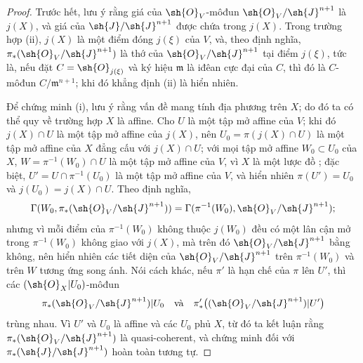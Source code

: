 \documentclass[oneside,10pt]{amsart}
\newcommand{\oldpage}[2][]{\marginnote{\normalfont\footnotesize\textbf{#1}~|~#2}\ignorespaces}
\begin{document}
\begin{proof}
Trước hết, lưu ý rằng giá của $\sh{O}_V$-môđun $\sh{O}_V/\sh{J}^{n+1}$ là $j(X)$, và giá của $\sh{J}/\sh{J}^{n+1}$ được chứa trong $j(X)$.
Trong trường hợp (ii), $j(X)$ là một điểm đóng $j(\xi)$ của $V$,
\oldpage[II]{185}
và, theo định nghĩa, $\pi_*(\sh{O}_V/\sh{J}^{n+1})$ là thớ của $\sh{O}_V/\sh{J}^{n+1}$ tại điểm $j(\xi)$, tức là, nếu đặt $C=\sh{O}_{j(\xi)}$ và ký hiệu $\mathfrak{m}$ là iđêan cực đại của $C$, thì đó là $C$-môđun $C/\mathfrak{m}^{n+1}$;
khi đó khẳng định (ii) là hiển nhiên.

Để chứng minh (i), lưu ý rằng vấn đề mang tính địa phương trên $X$;
do đó ta có thể quy về trường hợp $X$ là affine.
Cho $U$ là một tập mở affine của $V$;
khi đó $j(X)\cap U$ là một tập mở affine của $j(X)$, nên $U_0=\pi(j(X)\cap U)$ là một tập mở affine của $X$ đẳng cấu với $j(X)\cap U$;
với mọi tập mở affine $W_0\subset U_0$ của $X$, $W=\pi^{-1}(W_0)\cap U$ là một tập mở affine của $V$, vì $X$ là một lược đồ ;
đặc biệt, $U'=U\cap\pi^{-1}(U_0)$ là một tập mở affine của $V$, và hiển nhiên $\pi(U')=U_0$ và $j(U_0)=j(X)\cap U$.
Theo định nghĩa,
\[
  \Gamma(W_0,\pi_*(\sh{O}_V/\sh{J}^{n+1}))
  =\Gamma(\pi^{-1}(W_0),\sh{O}_V/\sh{J}^{n+1});
\]
nhưng vì mỗi điểm của $\pi^{-1}(W_0)$ không thuộc $j(W_0)$ đều có một lân cận mở trong $\pi^{-1}(W_0)$ không giao với $j(X)$, mà trên đó $\sh{O}_V/\sh{J}^{n+1}$ bằng không, nên hiển nhiên các tiết diện của $\sh{O}_V/\sh{J}^{n+1}$ trên $\pi^{-1}(W_0)$ và trên $W$ tương ứng song ánh.
Nói cách khác, nếu $\pi'$ là hạn chế của $\pi$ lên $U'$, thì các $(\sh{O}_X|U_0)$-môđun
\[
  \pi_*(\sh{O}_V/\sh{J}^{n+1})|U_0
  \quad\hbox{và}\quad
  \pi'_*\bigl((\sh{O}_V/\sh{J}^{n+1})|U'\bigr)
\]
trùng nhau.
Vì $U'$ và $U_0$ là affine và các $U_0$ phủ $X$, từ đó ta kết luận  rằng $\pi_*(\sh{O}_V/\sh{J}^{n+1})$ là quasi-coherent, và chứng minh đối với $\pi_*(\sh{J}/\sh{J}^{n+1})$ hoàn toàn tương tự.


\end{proof}
\end{document}
